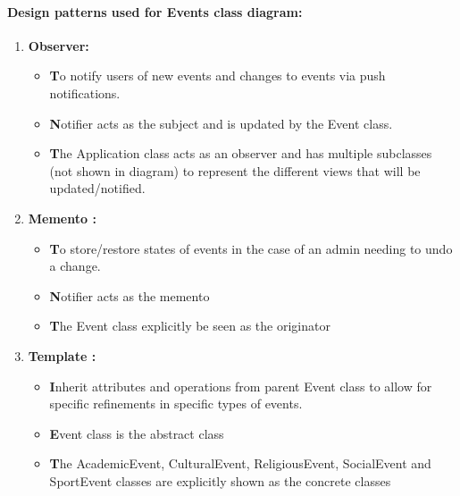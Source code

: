 \documentclass[11pt]{article}
\begin{document}
   \paragraph{Design patterns used for Events class diagram: }
		\begin{enumerate}
			\item \textbf{Observer:}
			\begin{itemize}
				\item \textbf To notify users of new events and changes to events via push notifications.
				\item \textbf Notifier acts as the subject and is updated by the Event class.
				\item \textbf The Application class acts as an observer and has multiple subclasses (not shown in diagram) to represent the different views that will be updated/notified.
			\end{itemize}
			
			\item \textbf{Memento :}
			\begin{itemize}
				\item \textbf To store/restore states of events in the case of an admin needing to undo a change.
				\item \textbf Notifier acts as the memento
				\item \textbf The Event class explicitly be seen as the originator
			\end{itemize}
			
			\item \textbf{Template :}
			\begin{itemize}
				\item \textbf Inherit attributes and operations from parent Event class to allow for specific refinements in specific types of events.
				\item \textbf Event class is the abstract class
				\item \textbf The AcademicEvent, CulturalEvent, ReligiousEvent, SocialEvent and SportEvent classes are explicitly shown as the concrete classes
			\end{itemize}	
		\end{enumerate}
		
\end{document}

